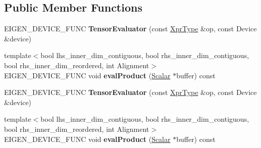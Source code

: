 \subsection*{Public Member Functions}
\begin{DoxyCompactItemize}
\item 
\mbox{\label{struct_eigen_1_1_tensor_evaluator_3_01const_01_tensor_contraction_op_3_01_indices_00_01_left_arg1f297d3eabde0efec8e4d9b1aa9abe5a_a0314a82bd876fc3ed14fa768c527ffe6}} 
E\+I\+G\+E\+N\+\_\+\+D\+E\+V\+I\+C\+E\+\_\+\+F\+U\+NC {\bfseries Tensor\+Evaluator} (const \hyperlink{class_eigen_1_1_tensor_contraction_op}{Xpr\+Type} \&op, const Device \&device)
\item 
\mbox{\label{struct_eigen_1_1_tensor_evaluator_3_01const_01_tensor_contraction_op_3_01_indices_00_01_left_arg1f297d3eabde0efec8e4d9b1aa9abe5a_a532d738db922b2b8fcc10fb5853573f9}} 
{\footnotesize template$<$bool lhs\+\_\+inner\+\_\+dim\+\_\+contiguous, bool rhs\+\_\+inner\+\_\+dim\+\_\+contiguous, bool rhs\+\_\+inner\+\_\+dim\+\_\+reordered, int Alignment$>$ }\\E\+I\+G\+E\+N\+\_\+\+D\+E\+V\+I\+C\+E\+\_\+\+F\+U\+NC void {\bfseries eval\+Product} (\hyperlink{group___sparse_core___module}{Scalar} $\ast$buffer) const
\item 
\mbox{\label{struct_eigen_1_1_tensor_evaluator_3_01const_01_tensor_contraction_op_3_01_indices_00_01_left_arg1f297d3eabde0efec8e4d9b1aa9abe5a_a0314a82bd876fc3ed14fa768c527ffe6}} 
E\+I\+G\+E\+N\+\_\+\+D\+E\+V\+I\+C\+E\+\_\+\+F\+U\+NC {\bfseries Tensor\+Evaluator} (const \hyperlink{class_eigen_1_1_tensor_contraction_op}{Xpr\+Type} \&op, const Device \&device)
\item 
\mbox{\label{struct_eigen_1_1_tensor_evaluator_3_01const_01_tensor_contraction_op_3_01_indices_00_01_left_arg1f297d3eabde0efec8e4d9b1aa9abe5a_a532d738db922b2b8fcc10fb5853573f9}} 
{\footnotesize template$<$bool lhs\+\_\+inner\+\_\+dim\+\_\+contiguous, bool rhs\+\_\+inner\+\_\+dim\+\_\+contiguous, bool rhs\+\_\+inner\+\_\+dim\+\_\+reordered, int Alignment$>$ }\\E\+I\+G\+E\+N\+\_\+\+D\+E\+V\+I\+C\+E\+\_\+\+F\+U\+NC void {\bfseries eval\+Product} (\hyperlink{group___sparse_core___module}{Scalar} $\ast$buffer) const
\end{DoxyCompactItemize}
